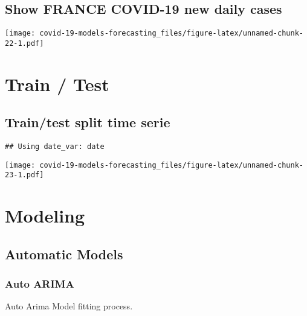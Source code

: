 \documentclass[
]{article}
\newenvironment{Shaded}{\begin{snugshade}}{\end{snugshade}}
\newcommand{\KeywordTok}[1]{\textcolor[rgb]{0.13,0.29,0.53}{\textbf{#1}}}
\newcommand{\NormalTok}[1]{#1}
\newcommand{\OperatorTok}[1]{\textcolor[rgb]{0.81,0.36,0.00}{\textbf{#1}}}
\newcommand{\StringTok}[1]{\textcolor[rgb]{0.31,0.60,0.02}{#1}}
\begin{document}
\hypertarget{show-france-covid-19-new-daily-cases}{%
\subsection{Show FRANCE COVID-19 new daily
cases}\label{show-france-covid-19-new-daily-cases}}

\texttt{[image: covid-19-models-forecasting\_files/figure-latex/unnamed-chunk-22-1.pdf]}

\hypertarget{train-test-1}{%
\section{Train / Test}\label{train-test-1}}

\hypertarget{traintest-split-time-serie-1}{%
\subsection{Train/test split time
serie}\label{traintest-split-time-serie-1}}

\begin{verbatim}
## Using date_var: date
\end{verbatim}

\texttt{[image: covid-19-models-forecasting\_files/figure-latex/unnamed-chunk-23-1.pdf]}

\hypertarget{modeling-1}{%
\section{Modeling}\label{modeling-1}}

\hypertarget{automatic-models-1}{%
\subsection{Automatic Models}\label{automatic-models-1}}

\hypertarget{auto-arima-1}{%
\subsubsection{Auto ARIMA}\label{auto-arima-1}}

Auto Arima Model fitting process.

\begin{Shaded}
\end{Shaded}
\end{document}
